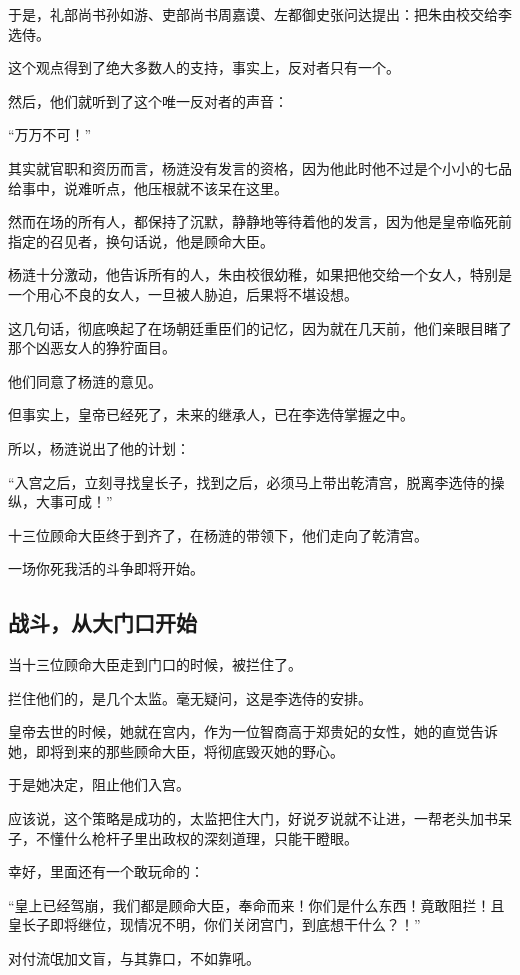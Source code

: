 \begin{multicols}{\theparacolNo}
		于是，礼部尚书孙如游、吏部尚书周嘉谟、左都御史张问达提出：把朱由校交给李选侍。

		这个观点得到了绝大多数人的支持，事实上，反对者只有一个。

		然后，他们就听到了这个唯一反对者的声音：

		“万万不可！”

		其实就官职和资历而言，杨涟没有发言的资格，因为他此时他不过是个小小的七品给事中，说难听点，他压根就不该呆在这里。

		然而在场的所有人，都保持了沉默，静静地等待着他的发言，因为他是皇帝临死前指定的召见者，换句话说，他是顾命大臣。

		杨涟十分激动，他告诉所有的人，朱由校很幼稚，如果把他交给一个女人，特别是一个用心不良的女人，一旦被人胁迫，后果将不堪设想。

		这几句话，彻底唤起了在场朝廷重臣们的记忆，因为就在几天前，他们亲眼目睹了那个凶恶女人的狰狞面目。

		他们同意了杨涟的意见。

		但事实上，皇帝已经死了，未来的继承人，已在李选侍掌握之中。

		所以，杨涟说出了他的计划：

		“入宫之后，立刻寻找皇长子，找到之后，必须马上带出乾清宫，脱离李选侍的操纵，大事可成！”

		十三位顾命大臣终于到齐了，在杨涟的带领下，他们走向了乾清宫。

		一场你死我活的斗争即将开始。

		\subsection{战斗，从大门口开始}
		当十三位顾命大臣走到门口的时候，被拦住了。

		拦住他们的，是几个太监。毫无疑问，这是李选侍的安排。

		皇帝去世的时候，她就在宫内，作为一位智商高于郑贵妃的女性，她的直觉告诉她，即将到来的那些顾命大臣，将彻底毁灭她的野心。

		于是她决定，阻止他们入宫。

		应该说，这个策略是成功的，太监把住大门，好说歹说就不让进，一帮老头加书呆子，不懂什么枪杆子里出政权的深刻道理，只能干瞪眼。

		幸好，里面还有一个敢玩命的：

		“皇上已经驾崩，我们都是顾命大臣，奉命而来！你们是什么东西！竟敢阻拦！且皇长子即将继位，现情况不明，你们关闭宫门，到底想干什么？！”

		对付流氓加文盲，与其靠口，不如靠吼。


\end{multicols}
